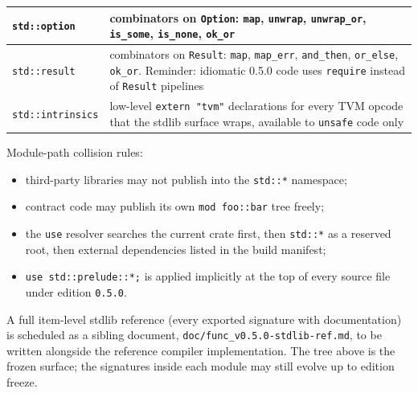 \documentclass[12pt,oneside]{article}
\begin{document}
\begin{longtable}{|l|p{}|}
\verb|std::option| & combinators on \verb|Option|: \verb|map|,
\verb|unwrap|, \verb|unwrap_or|, \verb|is_some|, \verb|is_none|,
\verb|ok_or| \\ \hline
\verb|std::result| & combinators on \verb|Result|: \verb|map|,
\verb|map_err|, \verb|and_then|, \verb|or_else|, \verb|ok_or|.
Reminder: idiomatic 0.5.0 code uses \verb|require| instead of
\verb|Result| pipelines \\ \hline
\verb|std::intrinsics| & low-level \verb|extern "tvm"| declarations for
every TVM opcode that the stdlib surface wraps, available to
\verb|unsafe| code only \\ \hline
\end{longtable}

Module-path collision rules:

\begin{itemize}
\item third-party libraries may not publish into the \verb|std::*|
namespace;
\item contract code may publish its own \verb|mod foo::bar| tree freely;
\item the \verb|use| resolver searches the current crate first, then
\verb|std::*| as a reserved root, then external dependencies listed in
the build manifest;
\item \verb|use std::prelude::*;| is applied implicitly at the top of
every source file under edition \verb|0.5.0|.
\end{itemize}

A full item-level stdlib reference (every exported signature with
documentation) is scheduled as a sibling document,
\verb|doc/func_v0.5.0-stdlib-ref.md|, to be written alongside the reference
compiler implementation. The tree above is the frozen surface; the
signatures inside each module may still evolve up to edition freeze.
\end{document}
